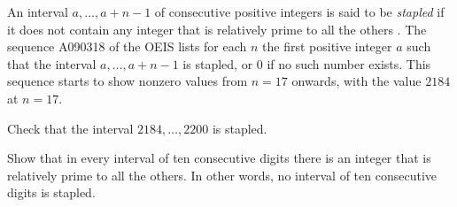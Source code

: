 \begin{challenge}
  \exercise An interval $a,\ldots,a+n-1$ of consecutive positive integers is said to be \emph{stapled} if it does not contain any integer that is relatively prime to all the others \cite{evans1969}. The sequence A090318 of the OEIS lists for each $n$ the first positive integer $a$ such that the interval $a,\ldots,a+n-1$ is stapled, or $0$ if no such number exists. This sequence starts to show nonzero values from $n=17$ onwards, with the value $2184$ at $n=17$.
  \begin{subexenum}
  \item Check that the interval $2184,\ldots, 2200$ is stapled.
  \item Show that in every interval of ten consecutive digits there is an integer that is relatively prime to all the others. In other words, no interval of ten consecutive digits is stapled.
  \end{subexenum}
\end{challenge}

